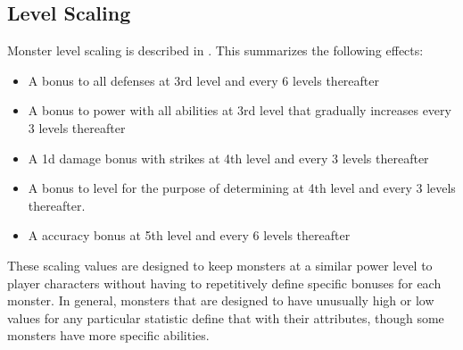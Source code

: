     \subsection{Level Scaling}
        Monster level scaling is described in .
        This summarizes the following effects:
        \begin{itemize}
            \item A  bonus to all defenses at 3rd level and every 6 levels thereafter
            \item A  bonus to power with all abilities at 3rd level that gradually increases every 3 levels thereafter
            \item A \plus1d damage bonus with strikes at 4th level and every 3 levels thereafter
            \item A  bonus to level for the purpose of determining  at 4th level and every 3 levels thereafter.
            \item A  accuracy bonus at 5th level and every 6 levels thereafter
        \end{itemize}
        These scaling values are designed to keep monsters at a similar power level to player characters without having to repetitively define specific bonuses for each monster.
        In general, monsters that are designed to have unusually high or low values for any particular statistic define that with their attributes, though some monsters have more specific abilities.

